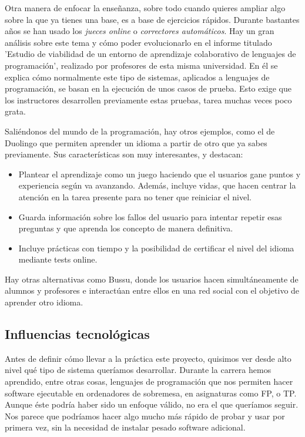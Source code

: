 Otra manera de enfocar la enseñanza, sobre todo cuando quieres ampliar algo sobre la que ya tienes una base, es a base de ejercicios rápidos. Durante bastantes años se han usado los \emph{jueces online} o \emph{correctores automáticos}. Hay un gran análisis sobre este tema y cómo poder evolucionarlo en el informe titulado 'Estudio de viabilidad de un entorno de aprendizaje colaborativo de lenguajes de programación'\cite{pimcdDuoCode14}, realizado por profesores de esta misma universidad. En él se explica cómo normalmente este tipo de sistemas, aplicados a lenguajes de programación, se basan en la ejecución de unos casos de prueba. Esto exige que los instructores desarrollen previamente estas pruebas, tarea muchas veces poco grata. 
\vspace{1em}

Saliéndonos del mundo de la programación, hay otros ejemplos, como el de Duolingo\cite{duolingo} que permiten aprender un idioma a partir de otro que ya sabes previamente. Sus características son muy interesantes, y destacan:

\begin{itemize}
\item
Plantear el aprendizaje como un juego haciendo que el usuarios gane puntos y experiencia según va avanzando. Además, incluye vidas, que hacen centrar la atención en la tarea presente para no tener que reiniciar el nivel.

\item
Guarda información sobre los fallos del usuario para intentar repetir esas preguntas y que aprenda los concepto de manera definitiva.

\item
Incluye prácticas con tiempo y la posibilidad de certificar el nivel del idioma mediante tests online.
\end{itemize}

Hay otras alternativas como Bussu\cite{bussu}, donde los usuarios hacen simultáneamente de alumnos y profesores e interactúan entre ellos en una red social con el objetivo de aprender otro idioma.

\subsection{Influencias tecnológicas\label{subsec:introduction}}

Antes de definir cómo llevar a la práctica este proyecto, quisimos ver desde alto nivel qué tipo de sistema queríamos desarrollar. Durante la carrera hemos aprendido, entre otras cosas, lenguajes de programación que nos permiten hacer software ejecutable en ordenadores de sobremesa, en asignaturas como FP\cite{FP}, o TP\cite{TP}. Aunque éste podría haber sido un enfoque válido, no era el que queríamos seguir. Nos parece que podríamos hacer algo mucho más rápido de probar y usar por primera vez, sin la necesidad de instalar pesado software adicional.
\vspace{1em}

